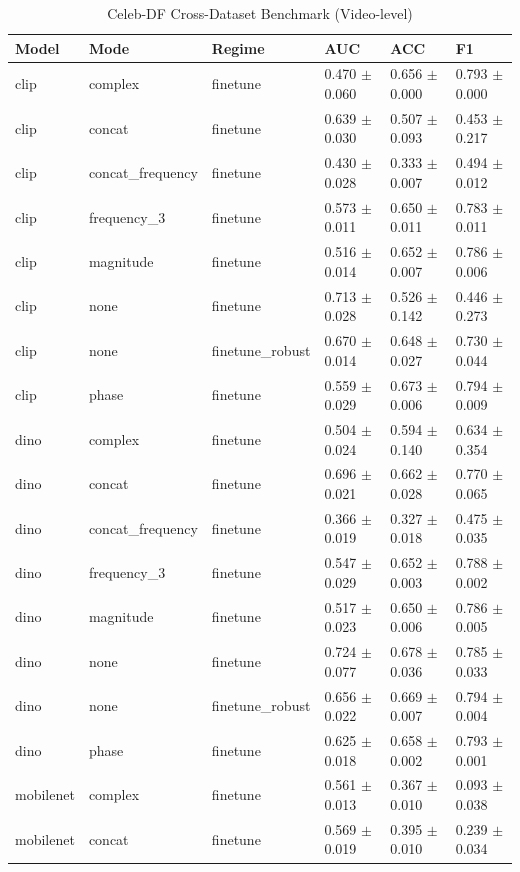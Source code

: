 \begin{table}
\caption{Celeb-DF Cross-Dataset Benchmark (Video-level)}
\label{tab:celebdf_video}
\begin{tabular}{llllll}
\toprule
Model & Mode & Regime & AUC & ACC & F1 \\
\midrule
clip & complex & finetune & 0.470 $\pm$ 0.060 & 0.656 $\pm$ 0.000 & 0.793 $\pm$ 0.000 \\
clip & concat & finetune & 0.639 $\pm$ 0.030 & 0.507 $\pm$ 0.093 & 0.453 $\pm$ 0.217 \\
clip & concat_frequency & finetune & 0.430 $\pm$ 0.028 & 0.333 $\pm$ 0.007 & 0.494 $\pm$ 0.012 \\
clip & frequency_3 & finetune & 0.573 $\pm$ 0.011 & 0.650 $\pm$ 0.011 & 0.783 $\pm$ 0.011 \\
clip & magnitude & finetune & 0.516 $\pm$ 0.014 & 0.652 $\pm$ 0.007 & 0.786 $\pm$ 0.006 \\
clip & none & finetune & 0.713 $\pm$ 0.028 & 0.526 $\pm$ 0.142 & 0.446 $\pm$ 0.273 \\
clip & none & finetune_robust & 0.670 $\pm$ 0.014 & 0.648 $\pm$ 0.027 & 0.730 $\pm$ 0.044 \\
clip & phase & finetune & 0.559 $\pm$ 0.029 & 0.673 $\pm$ 0.006 & 0.794 $\pm$ 0.009 \\
dino & complex & finetune & 0.504 $\pm$ 0.024 & 0.594 $\pm$ 0.140 & 0.634 $\pm$ 0.354 \\
dino & concat & finetune & 0.696 $\pm$ 0.021 & 0.662 $\pm$ 0.028 & 0.770 $\pm$ 0.065 \\
dino & concat_frequency & finetune & 0.366 $\pm$ 0.019 & 0.327 $\pm$ 0.018 & 0.475 $\pm$ 0.035 \\
dino & frequency_3 & finetune & 0.547 $\pm$ 0.029 & 0.652 $\pm$ 0.003 & 0.788 $\pm$ 0.002 \\
dino & magnitude & finetune & 0.517 $\pm$ 0.023 & 0.650 $\pm$ 0.006 & 0.786 $\pm$ 0.005 \\
dino & none & finetune & 0.724 $\pm$ 0.077 & 0.678 $\pm$ 0.036 & 0.785 $\pm$ 0.033 \\
dino & none & finetune_robust & 0.656 $\pm$ 0.022 & 0.669 $\pm$ 0.007 & 0.794 $\pm$ 0.004 \\
dino & phase & finetune & 0.625 $\pm$ 0.018 & 0.658 $\pm$ 0.002 & 0.793 $\pm$ 0.001 \\
mobilenet & complex & finetune & 0.561 $\pm$ 0.013 & 0.367 $\pm$ 0.010 & 0.093 $\pm$ 0.038 \\
mobilenet & concat & finetune & 0.569 $\pm$ 0.019 & 0.395 $\pm$ 0.010 & 0.239 $\pm$ 0.034 \\

\end{tabular}
\end{table}
